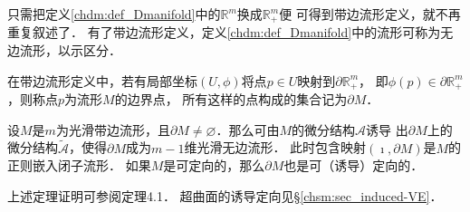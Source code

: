 \begin{definition}
    只需把定义\ref{chdm:def_Dmanifold}中的$\mathbb{R}^m$换成$\mathbb{R}^m_{+}$便
    可得到{\heiti 带边流形}定义，就不再重复叙述了．
    有了带边流形定义，定义\ref{chdm:def_Dmanifold}中的流形可称为无边流形，以示区分．
\end{definition}


在带边流形定义中，若有局部坐标$(U,\phi)$将点$p\in U$映射到$\partial \mathbb{R}^m_{+}$，
即$\phi(p)\in \partial \mathbb{R}^m_{+}$，则称点$p$为流形$M$的{\heiti 边界点}，
所有这样的点构成的集合记为$\partial M$．

\begin{theorem}\label{chdf:thm_induced-orientation}
    设$M$是$m$为光滑带边流形，且$\partial M\neq \varnothing$．那么可由$M$的微分结构$\mathscr{A}$诱导
    出$\partial M$上的微分结构$\widetilde{\mathscr{A}}$，使得$\partial M$成为$m-1$维光滑无边流形．
    此时包含映射$(\imath,\partial M)$是$M$的正则嵌入闭子流形．
    如果$M$是可定向的，那么$\partial M$也是可（诱导）定向的．
\end{theorem}

上述定理证明可参阅\parencite[\S3.4]{cc2001-zh}定理4.1．
超曲面的诱导定向见\S \ref{chsm:sec_induced-VE}．

